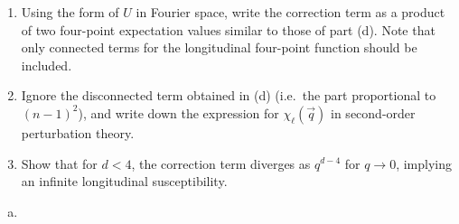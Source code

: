 \begin{problem}
\begin{enumerate}
        \item[(f)] Using the form of $U$ in Fourier space, write the correction term as a product of two four-point expectation values similar to those of part (d). Note that only connected terms for the longitudinal four-point function should be included.

        \item[(g)] Ignore the disconnected term obtained in (d) (i.e.\ the part proportional to $(n-1)^2$), and write down the expression for $\chi_\ell(\vec{q})$ in second-order perturbation theory.

        \item[(h)] Show that for $d < 4$, the correction term diverges as $q^{d-4}$ for $q \to 0$, implying an infinite longitudinal susceptibility.
    \end{enumerate}
\end{problem}

\begin{solution}
    \begin{enumerate}[(a)]
        \item
    \end{enumerate}
\end{solution}


